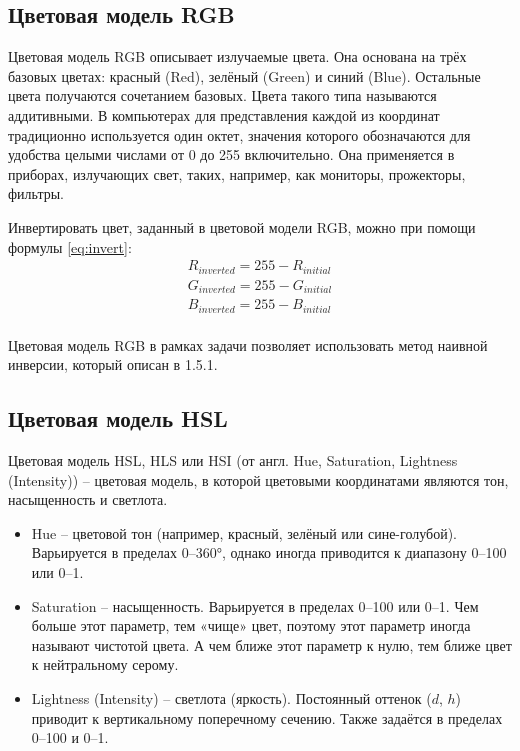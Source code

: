 \subsection{Цветовая модель RGB}

Цветовая модель RGB описывает излучаемые цвета. Она основана на трёх базовых цветах: красный (Red), зелёный (Green) и синий (Blue). Остальные цвета получаются сочетанием базовых. Цвета такого типа называются аддитивными. В компьютерах для представления каждой из координат традиционно используется один октет, значения которого обозначаются для удобства целыми числами от 0 до 255 включительно. Она применяется в приборах, излучающих свет, таких, например, как мониторы, прожекторы, фильтры.

Инвертировать цвет, заданный в цветовой модели  RGB, можно при помощи формулы \ref{eq:invert}:
\begin{equation}
	\label{eq:invert}
	\begin{split}
		R_{inverted} = 255 - R_{initial} \\
		G_{inverted} = 255 - G_{initial} \\
		B_{inverted} = 255 - B_{initial} \\
	\end{split}
\end{equation}

Цветовая модель RGB в рамках задачи позволяет использовать метод наивной инверсии, который описан в 1.5.1.

\subsection{Цветовая модель HSL}

Цветовая модель HSL, HLS или HSI (от англ. Hue, Saturation, Lightness (Intensity)) -- цветовая модель, в которой цветовыми координатами являются тон, насыщенность и светлота.

\begin{itemize}
	\item Hue -- цветовой тон (например, красный, зелёный или сине-голубой). Варьируется в пределах 0--360°, однако иногда приводится к диапазону 0--100 или 0--1.
	\item Saturation -- насыщенность. Варьируется в пределах 0--100 или 0--1. Чем больше этот параметр, тем «чище» цвет, поэтому этот параметр иногда называют чистотой цвета. А чем ближе этот параметр к нулю, тем ближе цвет к нейтральному серому.
	\item Lightness (Intensity) -- светлота (яркость). Постоянный оттенок ($d$, $h$) приводит к вертикальному поперечному сечению. Также задаётся в пределах 0--100 и 0--1.
\end{itemize}

